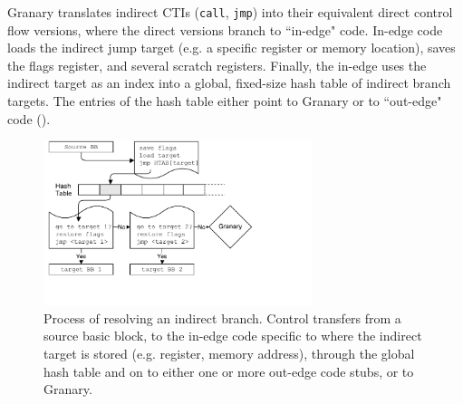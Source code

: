 \documentclass[preprint]{sigplanconf}
\begin{document}


Granary translates indirect CTIs (\texttt{call}, \texttt{jmp}) into their equivalent direct control flow versions, where the direct versions branch to ``in-edge" code. In-edge code loads the indirect jump target (e.g. a specific register or memory location), saves the flags register, and several scratch registers. Finally, the in-edge uses the indirect target as an index into a global, fixed-size hash table of indirect branch targets. The entries of the hash table either point to Granary or to ``out-edge" code (). 

\begin{figure}[t!]
\hspace{4em}\includegraphics[height=13em,clip=true,trim=0 5em 10em 0]{diagrams/ibl.pdf}
\caption{\label{fig:ibl}Process of resolving an indirect branch. Control transfers from a source basic block, to the in-edge code specific to where the indirect target is stored (e.g. register, memory address), through the global hash table and on to either one or more out-edge code stubs, or to Granary.}
\end{figure}
\end{document}
